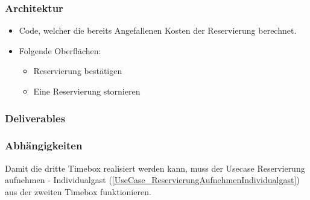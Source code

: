 \subsubsection{Architektur}
\begin{itemize}
	\item Code, welcher die bereits Angefallenen Kosten der Reservierung berechnet.
	\item Folgende Oberflächen:
	\begin{itemize}
		\item Reservierung bestätigen
		\item Eine Reservierung stornieren
	\end{itemize}
\end{itemize}
\subsubsection{Deliverables}
\subsubsection{Abhängigkeiten}
Damit die dritte Timebox realisiert werden kann, muss der Usecase Reservierung aufnehmen - Individualgast (\ref{UseCase_ReservierungAufnehmenIndividualgast}) aus der zweiten Timebox funktionieren.
